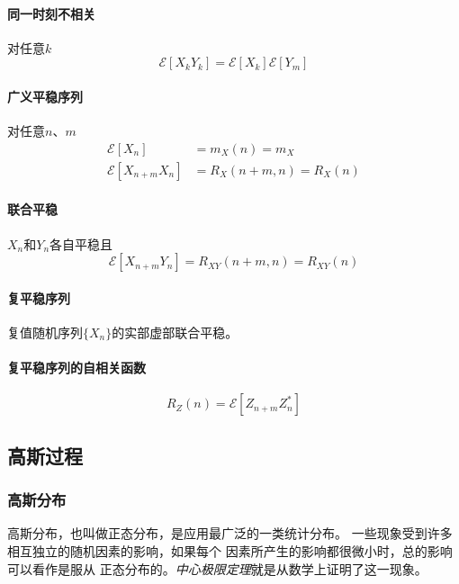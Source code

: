     \paragraph{同一时刻不相关}对任意$k$\vspace{-0.5ex}
    \begin{equation}
        \mathscr{E}[X_kY_k]=\mathscr{E}[X_k]\mathscr{E}[Y_m]
    \end{equation}
    \paragraph{广义平稳序列}对任意$n$、$m$\vspace{-0.5ex}
    \begin{align}
        \mathscr{E}[X_n]&=m_X(n)=m_X\\
        \mathscr{E}[X_{n+m}X_n]&=R_X(n+m,n)=R_X(n)
    \end{align}
    \paragraph{联合平稳}$X_n$和$Y_n$各自平稳且\vspace{-0.5ex}
    \begin{equation}
        \mathscr{E}[X_{n+m}Y_n]=R_{XY}(n+m,n)=R_{XY}(n)
    \end{equation}
    \paragraph{复平稳序列}复值随机序列$\{X_n\}$的实部虚部联合平稳。

    \paragraph{复平稳序列的自相关函数}\vspace{-0.5ex}
    \begin{equation}
        R_Z(n)=\mathscr{E}[Z_{n+m}Z_n^*]
    \end{equation}

\subsection{高斯过程}
    \subsubsection{高斯分布}
    高斯分布，也叫做正态分布，是应用最广泛的一类统计分布。
    一些现象受到许多相互独立的随机因素的影响，如果每个
    因素所产生的影响都很微小时，总的影响可以看作是服从
    正态分布的。\emph{中心极限定理}就是从数学上证明了这一现象。
    
